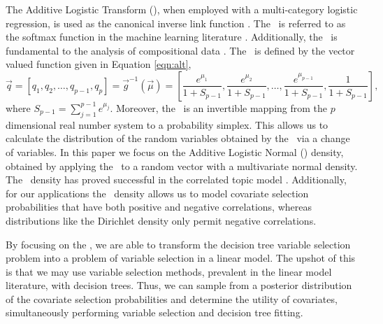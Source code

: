 The Additive Logistic Transform (\ALT), when employed with a multi-category logistic regression, is used as the canonical inverse link function \cite{mccullagh1989generalized}. The \ALT\ is referred to as the softmax function in the machine learning literature \cite{bishop2006pattern}. Additionally, the \ALT\ is fundamental to the analysis of compositional data \cite{aitchison1986statistical}. The \ALT\ is defined by the vector valued function given in Equation \ref{eqn:alt}, 
\begin{equation}\label{eqn:alt}
\vec{q} = \left[ q_1, q_2,\dots, q_{p-1}, q_p \right] =\vec{g}^{-1}(\vec{\mu})= \left[ \frac{e^{\mu_1}}{1+S_{p-1}},\frac{e^{\mu_2}}{1+S_{p-1}}, \dots,\frac{e^{\mu_{p-1}}}{1+S_{p-1}},\frac{1}{1+S_{p-1}} \right],\end{equation} 
where $S_{p-1}=\sum_{j=1}^{p-1}e^{\mu_j}$. Moreover, the \ALT\ is an invertible mapping from the $p$ dimensional real number system to a probability simplex. This allows us to calculate the distribution of the random variables obtained by the \ALT\ via a change of variables. In this paper we focus on the Additive Logistic Normal (\ALN) density, obtained by applying the \ALT\ to a random vector with a multivariate normal density. The \ALN\ density has proved successful in the correlated topic model \cite{blei2007correlated,lafferty2005correlated}.  Additionally, for our applications the \ALN\ density allows us to model covariate selection probabilities that have both positive and negative correlations, whereas distributions like the Dirichlet density only permit negative correlations.

By focusing on the \ALT, we are able to transform the decision tree variable selection problem into a problem of variable selection in a linear model. The upshot of this is that we may use variable selection methods, prevalent in the linear model literature, with decision trees. Thus, we can sample from a posterior distribution of the covariate selection probabilities and determine the utility of covariates, simultaneously performing variable selection and decision tree fitting. 
 
